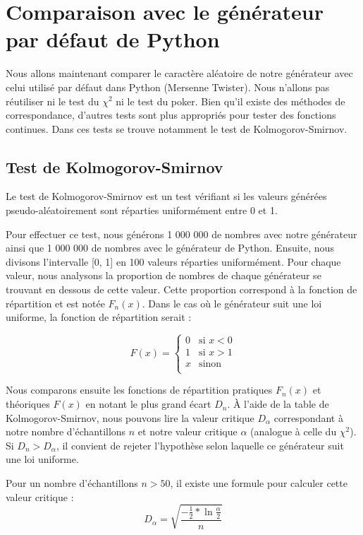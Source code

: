\documentclass[10pt,a4paper]{article}
\begin{document}
	\newpage
	\section{Comparaison avec le générateur par défaut de Python}
	Nous allons maintenant comparer le caractère aléatoire de notre générateur avec celui utilisé par défaut dans Python (Mersenne Twister).
	Nous n'allons pas réutiliser ni le test du $\chi^2$ ni le test du poker.
	Bien qu'il existe des méthodes de correspondance, d'autres tests sont plus appropriés pour tester des fonctions continues.
	Dans ces tests se trouve notamment le test de Kolmogorov-Smirnov.
	
	\newpage
	\subsection{Test de Kolmogorov-Smirnov}
	Le test de Kolmogorov-Smirnov est un test vérifiant si les valeurs générées pseudo-aléatoirement sont réparties uniformément entre 0 et 1.
	
	Pour effectuer ce test, nous générons 1 000 000 de nombres avec notre générateur ainsi que 1 000 000 de nombres avec le générateur de Python.
	Ensuite, nous divisons l'intervalle [0, 1] en 100 valeurs réparties uniformément.
	Pour chaque valeur, nous analysons la proportion de nombres de chaque générateur se trouvant en dessous de cette valeur.
	Cette proportion correspond à la fonction de répartition et est notée $F_n(x)$.
	Dans le cas où le générateur suit une loi uniforme, la fonction de répartition serait :
	
	\begin{equation*}
		F(x) = 
		\begin{cases}
			0 & \text{si } x < 0 \\
			1 & \text{si } x > 1\\
			x & \text{sinon }\\
		\end{cases}
	\end{equation*}
	
	Nous comparons ensuite les fonctions de répartition pratiques $F_n(x)$ et théoriques $F(x)$ en notant le plus grand écart $D_n$. 
	À l'aide de la table de Kolmogorov-Smirnov, nous pouvons lire la valeur critique $D_\alpha$ correspondant à notre nombre d'échantillons $n$ et notre valeur critique $\alpha$ (analogue à celle du $\chi^2$).
	Si $D_n > D_\alpha$, il convient de rejeter l'hypothèse selon laquelle ce générateur suit une loi uniforme.
	
	Pour un nombre d'échantillons $n > 50$, il existe une formule pour calculer cette valeur critique :
	\begin{equation*}
		D_\alpha = \sqrt{
			\frac{
			- \frac{1}{2} * \ln{\frac{\alpha}{2}}
			}{n}
		}
	\end{equation*}
	
\end{document}
